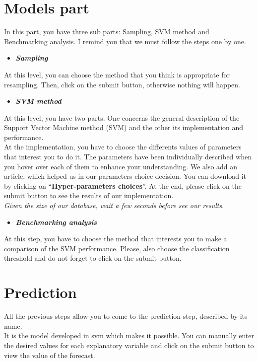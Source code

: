 \documentclass[]{article}
\providecommand{\tightlist}{%
  \setlength{\itemsep}{0pt}\setlength{\parskip}{0pt}}
\begin{document}
\section{Models part}\label{models-part}

In this part, you have three sub parts: Sampling, SVM method and
Benchmarking analysis. I remind you that we must follow the steps one by
one.

\begin{itemize}
\tightlist
\item
  \emph{\textbf{Sampling}}
\end{itemize}

At this level, you can choose the method that you think is appropriate
for resampling. Then, click on the submit button, otherwise nothing will
happen.

\begin{itemize}
\tightlist
\item
  \emph{\textbf{SVM method}}
\end{itemize}

At this level, you have two parts. One concerns the general description
of the Support Vector Machine method (SVM) and the other its
implementation and performance.\\
At the implementation, you have to choose the differents values of
parameters that interest you to do it. The parameters have been
individually described when you hover over each of them to enhance your
understanding. We also add an article, which helped us in our parameters
choice decision. You can download it by clicking on
``\textbf{Hyper-parameters choices}''. At the end, please click on the
submit button to see the results of our implementation.\\
\emph{Given the size of our database, wait a few seconds before see our
results}.

\begin{itemize}
\tightlist
\item
  \emph{\textbf{Benchmarking analysis}}
\end{itemize}

At this step, you have to choose the method that interests you to make a
comparison of the SVM performance. Please, also choose the
classification threshold and do not forget to click on the submit
button.

\section{Prediction}\label{prediction}

All the previous steps allow you to come to the prediction step,
described by its name.\\
It is the model developed in svm which makes it possible. You can
manually enter the desired values for each explanatory variable and
click on the submit button to view the value of the forecast.
\end{document}
